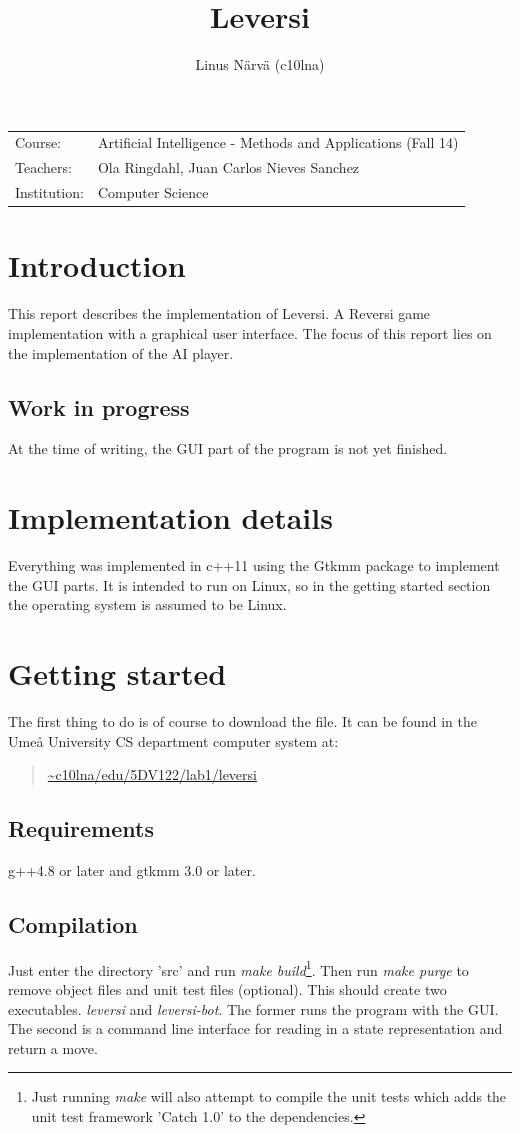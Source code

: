 \documentclass[a4paper,11pt]{article}
\title{Leversi}
\author{Linus Närvä (c10lna)}
\begin{document}
\maketitle

\begin{tabular}{l l}
Course: & Artificial Intelligence - Methods and Applications (Fall 14) \\
Teachers: & Ola Ringdahl, Juan Carlos Nieves Sanchez \\
Institution: & Computer Science \\
\end{tabular}

\section{Introduction}
This report describes the implementation of Leversi. A Reversi game implementation with a graphical user interface. The focus of this report lies on the implementation of the AI player.

\subsection{Work in progress}
At the time of writing, the GUI part of the program is not yet finished.

\section{Implementation details}
Everything was implemented in c++11 using the Gtkmm package to implement the GUI parts. It is intended to run on Linux, so in the getting started section the operating system is assumed to be Linux.

\section{Getting started}
The first thing to do is of course to download the file. It can be found in the Umeå University CS department computer system at:
\begin{quotation}
\url{~c10lna/edu/5DV122/lab1/leversi}
\end{quotation}

\subsection{Requirements}
g++4.8 or later and gtkmm 3.0 or later.

\subsection{Compilation}
Just enter the directory 'src' and run \textit{make build}\footnote{Just running \textit{make} will also attempt to compile the unit tests which adds the unit test framework 'Catch 1.0' to the dependencies.}. Then run \textit{make purge} to remove object files and unit test files (optional). This should create two executables. \textit{leversi} and \textit{leversi-bot}. The former runs the program with the GUI. The second is a command line interface for reading in a state representation and return a move.
\end{document}
